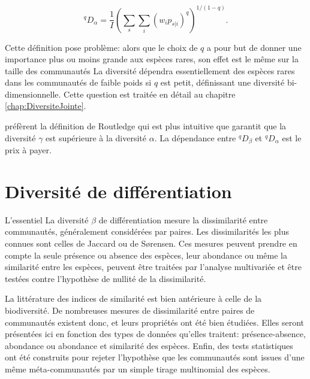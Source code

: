 \documentclass[
  11pt,
  french,
  a4paper,
  extrafontsizes,onecolumn,openright
  ]{memoir}
\newenvironment{Essentiel}
  {\begin{bclogo}[logo=\bctrombone, noborder=true, couleur=lightgray!50]{L'essentiel}\parindent0pt}
  {\end{bclogo}}
\begin{document}
\begin{equation}
  \label{eq:Chiualpha}
  ^{q}\!D_{\alpha}=\frac{1}{I}{\left(\sum_s{\sum_i{{\left(w_ip_{s|i}\right)}^q}}\right)}^{{1}/{\left(1-q\right)}}.
\end{equation}

Cette définition pose problème: alors que le choix de \(q\) a pour but de donner une importance plus ou moins grande aux espèces rares, son effet est le même sur la taille des communautés La diversité dépendra essentiellement des espèces rares dans les communautés de faible poids si \(q\) est petit, définissant une diversité bi-dimensionnelle.
Cette question est traitée en détail au chapitre \ref{chap:DiversiteJointe}.

\textcite{Marcon2014a} préfèrent la définition de Routledge qui est plus intuitive que garantit que la diversité \(\gamma\) est supérieure à la diversité \(\alpha\).
La dépendance entre \(^{q}\!D_{\beta}\) et \(^{q}\!D_{\alpha}\) est le prix à payer.

\hypertarget{chap:BetaPaires}{%
\chapter{Diversité de différentiation}\label{chap:BetaPaires}}

\scriptsize

\begin{Essentiel}
La diversité \(\beta\) de différentiation mesure la dissimilarité entre
communautés, généralement considérées par paires. Les dissimilarités les
plus connues sont celles de Jaccard ou de Sørensen. Ces mesures peuvent
prendre en compte la seule présence ou absence des espèces, leur
abondance ou même la similarité entre les espèces, peuvent être traitées
par l'analyse multivariée et être testées contre l'hypothèse de nullité
de la dissimilarité.
\end{Essentiel}

\normalsize

La littérature des indices de similarité est bien antérieure à celle de la biodiversité.
De nombreuses mesures de dissimilarité entre paires de communautés existent donc, et leurs propriétés ont été bien étudiées.
Elles seront présentées ici en fonction des types de données qu'elles traitent: présence-absence, abondance ou abondance et similarité des espèces.
Enfin, des tests statistiques ont été construits pour rejeter l'hypothèse que les communautés sont issues d'une même méta-communautés par un simple tirage multinomial des espèces.
\end{document}
